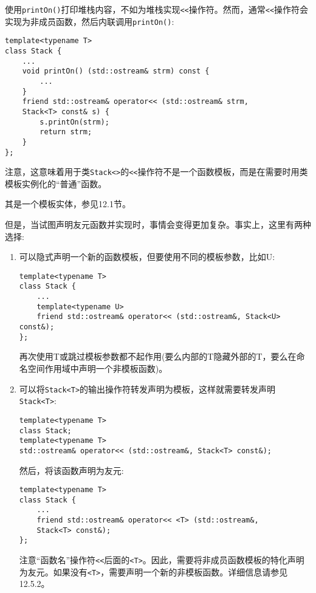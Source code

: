 
使用\texttt{printOn()}打印堆栈内容，不如为堆栈实现\texttt{<<}操作符。然而，通常\texttt{<<}操作符会实现为非成员函数，然后内联调用\texttt{printOn()}:

\begin{lstlisting}[style=styleCXX]
template<typename T>
class Stack {
	...
	void printOn() (std::ostream& strm) const {
		...
	}
	friend std::ostream& operator<< (std::ostream& strm,
	Stack<T> const& s) {
		s.printOn(strm);
		return strm;
	}
};
\end{lstlisting}

注意，这意味着用于类\texttt{Stack<>}的\texttt{<<}操作符不是一个函数模板，而是在需要时用类模板实例化的“普通”函数。

\begin{tcolorbox}[colback=webgreen!5!white,colframe=webgreen!75!black]
\hspace*{0.75cm}其是一个模板实体，参见12.1节。
\end{tcolorbox}

但是，当试图声明友元函数并实现时，事情会变得更加复杂。事实上，这里有两种选择:

\begin{enumerate}
\item 
可以隐式声明一个新的函数模板，但要使用不同的模板参数，比如U:

\begin{lstlisting}[style=styleCXX]
template<typename T>
class Stack {
	...
	template<typename U>
	friend std::ostream& operator<< (std::ostream&, Stack<U> const&);
};
\end{lstlisting}

再次使用T或跳过模板参数都不起作用(要么内部的T隐藏外部的T，要么在命名空间作用域中声明一个非模板函数)。

\item 
可以将\texttt{Stack<T>}的输出操作符转发声明为模板，这样就需要转发声明\texttt{Stack<T>}:

\begin{lstlisting}[style=styleCXX]
template<typename T>
class Stack;
template<typename T>
std::ostream& operator<< (std::ostream&, Stack<T> const&);
\end{lstlisting}

然后，将该函数声明为友元:

\begin{lstlisting}[style=styleCXX]
template<typename T>
class Stack {
	...
	friend std::ostream& operator<< <T> (std::ostream&,
	Stack<T> const&);
};
\end{lstlisting}

注意“函数名”操作符\texttt{<<}后面的\texttt{<T>}。因此，需要将非成员函数模板的特化声明为友元。如果没有\texttt{<T>}，需要声明一个新的非模板函数。详细信息请参见12.5.2。
\end{enumerate}


